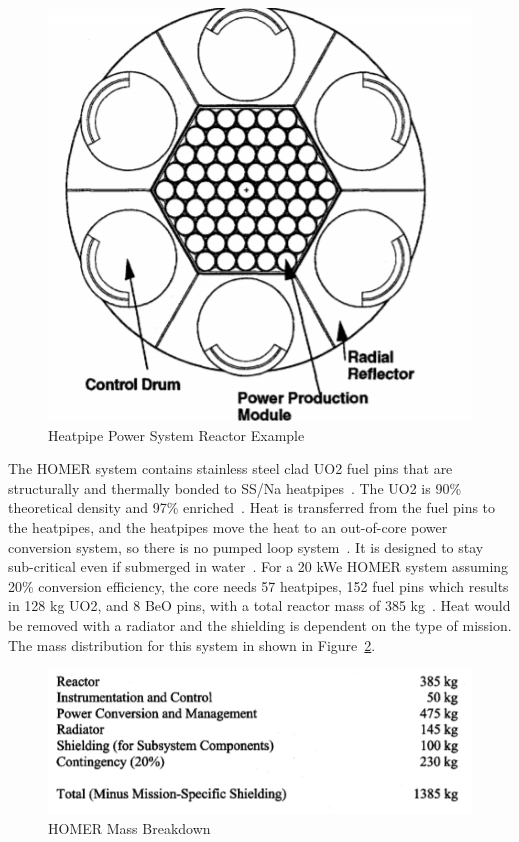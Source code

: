 \documentclass{article}
\begin{document}
\begin{figure}[]
	\centering
	\includegraphics[height=0.45\textheight]{fig/appP}
	\caption[Heatpipe Power System Reactor Example]{Heatpipe Power System Reactor Example~\cite{poston2001heatpipe}}
	\label{appP}
\end{figure}

The HOMER system contains stainless steel clad UO2 fuel pins that are structurally and thermally bonded to SS/Na heatpipes~\cite{poston2001heatpipe}. The UO2 is 90\% theoretical density and 97\% enriched~\cite{poston2001heatpipe}. Heat is transferred from the fuel pins to the heatpipes, and the heatpipes move the heat to an out-of-core power conversion system, so there is no pumped loop system~\cite{poston2001heatpipe}. It is designed to stay sub-critical even if submerged in water~\cite{poston2001heatpipe}. For a 20 kWe HOMER system assuming 20\% conversion efficiency, the core needs 57 heatpipes, 152 fuel pins which results in 128 kg UO2, and 8 BeO pins, with a total reactor mass of 385 kg~\cite{poston2001heatpipe}. Heat would be removed with a radiator and the shielding is dependent on the type of mission. The mass distribution for this system in shown in Figure~\ref{appQ}. 


\begin{figure}[]
	\centering
	\includegraphics[height=0.15\textheight]{fig/appQ}
	\caption[HOMER Mass Breakdown]{HOMER Mass Breakdown~\cite{poston2001heatpipe}}
	\label{appQ}
\end{figure}
\end{document}
